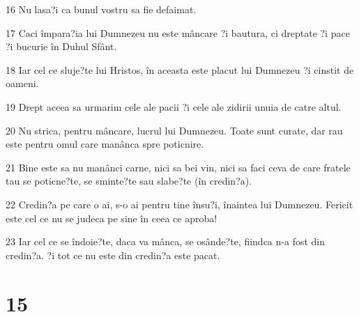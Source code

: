 \par 16 Nu lasa?i ca bunul vostru sa fie defaimat.
\par 17 Caci împara?ia lui Dumnezeu nu este mâncare ?i bautura, ci dreptate ?i pace ?i bucurie în Duhul Sfânt.
\par 18 Iar cel ce sluje?te lui Hristos, în aceasta este placut lui Dumnezeu ?i cinstit de oameni.
\par 19 Drept aceea sa urmarim cele ale pacii ?i cele ale zidirii unuia de catre altul.
\par 20 Nu strica, pentru mâncare, lucrul lui Dumnezeu. Toate sunt curate, dar rau este pentru omul care manânca spre poticnire.
\par 21 Bine este sa nu manânci carne, nici sa bei vin, nici sa faci ceva de care fratele tau se poticne?te, se sminte?te sau slabe?te (în credin?a).
\par 22 Credin?a pe care o ai, s-o ai pentru tine însu?i, înaintea lui Dumnezeu. Fericit este cel ce nu se judeca pe sine în ceea ce aproba!
\par 23 Iar cel ce se îndoie?te, daca va mânca, se osânde?te, fiindca n-a fost din credin?a. ?i tot ce nu este din credin?a este pacat.

\chapter{15}

